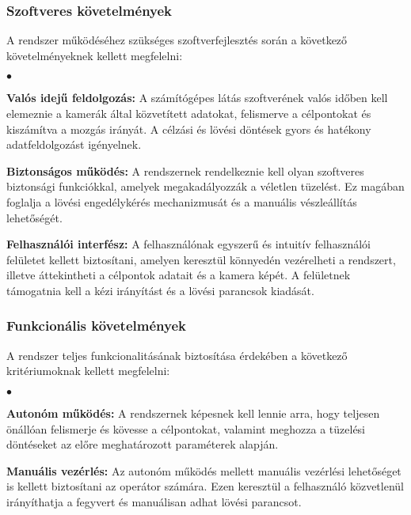 \subsubsection*{Szoftveres követelmények}

A rendszer működéséhez szükséges szoftverfejlesztés során a következő követelményeknek kellett megfelelni:

\begin{list}{$\bullet$}{}
	\item \textbf{Valós idejű feldolgozás:}  A számítógépes látás szoftverének valós időben kell elemeznie a kamerák által közvetített adatokat, felismerve a célpontokat és kiszámítva a mozgás irányát. A célzási és lövési döntések gyors és hatékony adatfeldolgozást igényelnek.
	\item \textbf{Biztonságos működés:} A rendszernek rendelkeznie kell olyan szoftveres biztonsági funkciókkal, amelyek megakadályozzák a véletlen tüzelést. Ez magában foglalja a lövési engedélykérés mechanizmusát és a manuális vészleállítás lehetőségét.
	\item \textbf{Felhasználói interfész:} A felhasználónak egyszerű és intuitív felhasználói felületet kellett biztosítani, amelyen keresztül könnyedén vezérelheti a rendszert, illetve áttekintheti a célpontok adatait és a kamera képét. A felületnek támogatnia kell a kézi irányítást és a lövési parancsok kiadását.
\end{list}




\subsubsection*{Funkcionális követelmények}

A rendszer teljes funkcionalitásának biztosítása érdekében a következő kritériumoknak kellett megfelelni:

\begin{list}{$\bullet$}{}
	\item \textbf{Autonóm működés:} A rendszernek képesnek kell lennie arra, hogy teljesen önállóan felismerje és kövesse a célpontokat, valamint meghozza a tüzelési döntéseket az előre meghatározott paraméterek alapján.
	\item \textbf{Manuális vezérlés:} Az autonóm működés mellett manuális vezérlési lehetőséget is kellett biztosítani az operátor számára. Ezen keresztül a felhasználó közvetlenül irányíthatja a fegyvert és manuálisan adhat lövési parancsot.
\end{list}

